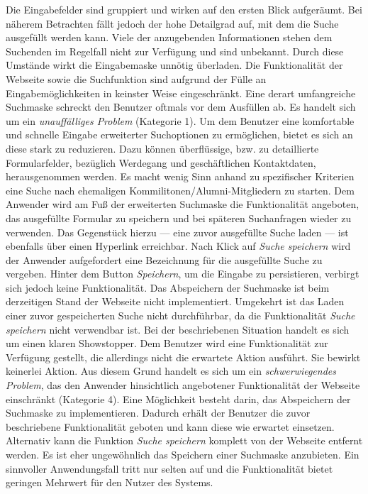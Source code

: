 {
	Die Eingabefelder sind gruppiert und wirken auf den ersten Blick aufgeräumt. Bei näherem Betrachten fällt jedoch der hohe Detailgrad auf, mit dem die Suche ausgefüllt werden kann. Viele der anzugebenden Informationen stehen dem Suchenden im Regelfall nicht zur Verfügung und sind unbekannt. Durch diese Umstände wirkt die Eingabemaske unnötig überladen.
}
{
	Die Funktionalität der Webseite sowie die Suchfunktion sind aufgrund der Fülle an Eingabemöglichkeiten in keinster Weise eingeschränkt. Eine derart umfangreiche Suchmaske schreckt den Benutzer oftmals vor dem Ausfüllen ab. Es handelt sich um ein \emph{unauffälliges Problem} (Kategorie 1).
}
{
	Um dem Benutzer eine komfortable und schnelle Eingabe erweiterter Suchoptionen zu ermöglichen, bietet es sich an diese stark zu reduzieren. Dazu können überflüssige, bzw. zu detaillierte Formularfelder, bezüglich Werdegang und geschäftlichen Kontaktdaten, herausgenommen werden. Es macht wenig Sinn anhand zu spezifischer Kriterien eine Suche nach ehemaligen Kommilitonen/Alumni-Mitgliedern zu starten.
}
{
	Dem Anwender wird am Fuß der erweiterten Suchmaske die Funktionalität angeboten, das ausgefüllte Formular zu speichern und bei späteren Suchanfragen wieder zu verwenden. Das Gegenstück hierzu --- eine zuvor ausgefüllte Suche laden --- ist ebenfalls über einen Hyperlink erreichbar. Nach Klick auf \emph{Suche speichern} wird der Anwender aufgefordert eine Bezeichnung für die ausgefüllte Suche zu vergeben. Hinter dem Button \emph{Speichern}, um die Eingabe zu persistieren, verbirgt sich jedoch keine Funktionalität. Das Abspeichern der Suchmaske ist beim derzeitigen Stand der Webseite nicht implementiert. Umgekehrt ist das Laden einer zuvor gespeicherten Suche nicht durchführbar, da die Funktionalität \emph{Suche speichern} nicht verwendbar ist.
}
{
	Bei der beschriebenen Situation handelt es sich um einen klaren \glqq Showstopper\grqq . Dem Benutzer wird eine Funktionalität zur Verfügung gestellt, die allerdings nicht die erwartete Aktion ausführt. Sie bewirkt keinerlei Aktion. Aus diesem Grund handelt es sich um ein \emph{schwerwiegendes Problem}, das den Anwender hinsichtlich angebotener Funktionalität der Webseite einschränkt (Kategorie 4).
}
{
	Eine Möglichkeit besteht darin, das Abspeichern der Suchmaske zu implementieren. Dadurch erhält der Benutzer die zuvor beschriebene Funktionalität geboten und kann diese wie erwartet einsetzen. Alternativ kann die Funktion \emph{Suche speichern} komplett von der Webseite entfernt werden. Es ist eher ungewöhnlich das Speichern einer Suchmaske anzubieten. Ein sinnvoller Anwendungsfall tritt nur selten auf und die Funktionalität bietet geringen Mehrwert für den Nutzer des Systems.
}

